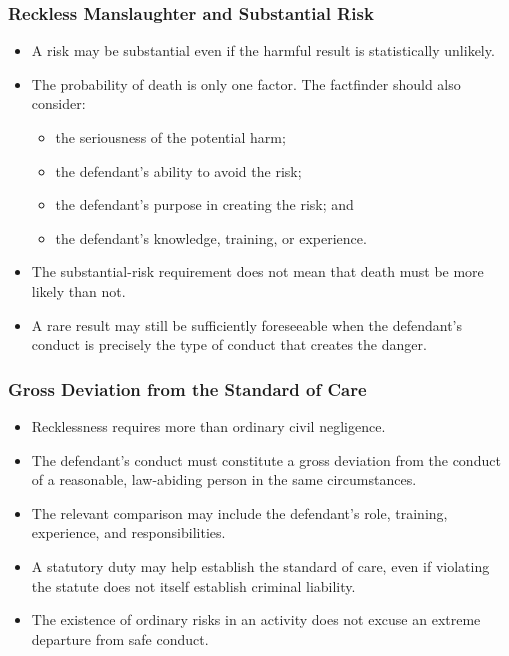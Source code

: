 \documentclass[11pt]{tex/lawoutline}
\begin{document}
\subsubsection{Reckless Manslaughter and Substantial Risk}
\begin{itemize}
    \item A risk may be substantial even if the harmful result is statistically unlikely.
    \item The probability of death is only one factor. The factfinder should also consider:
    \begin{itemize}
        \item the seriousness of the potential harm;
        \item the defendant's ability to avoid the risk;
        \item the defendant's purpose in creating the risk; and
        \item the defendant's knowledge, training, or experience.
    \end{itemize}
    \item The substantial-risk requirement does not mean that death must be more likely than not.
    \item A rare result may still be sufficiently foreseeable when the defendant's conduct is precisely the type of conduct that creates the danger.
\end{itemize}


\subsubsection{Gross Deviation from the Standard of Care}
\begin{itemize}
    \item Recklessness requires more than ordinary civil negligence.
    \item The defendant's conduct must constitute a gross deviation from the conduct of a reasonable, law-abiding person in the same circumstances.
    \item The relevant comparison may include the defendant's role, training, experience, and responsibilities.
    \item A statutory duty may help establish the standard of care, even if violating the statute does not itself establish criminal liability.
    \item The existence of ordinary risks in an activity does not excuse an extreme departure from safe conduct.
\end{itemize}
\end{document}
